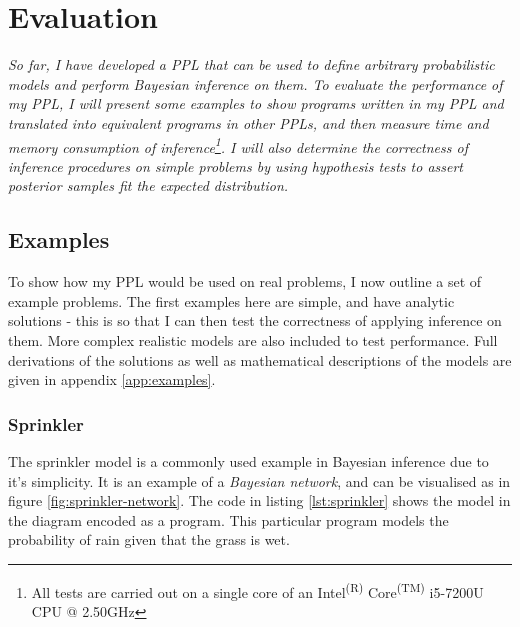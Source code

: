 



\chapter{Evaluation}

\textit{So far, I have developed a PPL that can be used to define arbitrary probabilistic models and perform Bayesian inference on them. To evaluate the performance of my PPL, I will present some examples to show programs written in my PPL and translated into equivalent programs in other PPLs, and then measure time and memory consumption of inference\footnote{All tests are carried out on a single core of an Intel\textsuperscript{(R)} Core\textsuperscript{(TM)} i5-7200U CPU @ 2.50GHz}. I will also determine the correctness of inference procedures on simple problems by using hypothesis tests to assert posterior samples fit the expected distribution.}

\section{Examples}
To show how my PPL would be used on real problems, I now outline a set of example problems. The first examples here are simple, and have analytic solutions - this is so that I can then test the correctness of applying inference on them. More complex realistic models are also included to test performance. Full derivations of the solutions as well as mathematical descriptions of the models are given in appendix \ref{app:examples}.

\subsection{Sprinkler}
The sprinkler model is a commonly used example in Bayesian inference due to it's simplicity. It is an example of a \textit{Bayesian network}, and can be visualised as in figure \ref{fig:sprinkler-network}. The code in listing \ref{lst:sprinkler} shows the model in the diagram encoded as a program. This particular program models the probability of rain given that the grass is wet.

